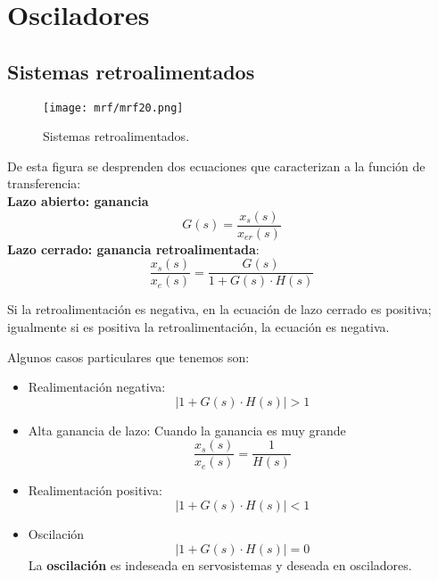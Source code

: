 \documentclass[
	12pt, %
	fleqn, %
	a4paper, %
	oneside, %
]{LegrandOrangeBook}
\begin{document}
\section{Osciladores}
\subsection{Sistemas retroalimentados}
\begin{figure}[H]
\centering
\texttt{[image: mrf/mrf20.png]}
\caption{Sistemas retroalimentados.}
\label{fig:sis retro}
\end{figure}
De esta figura se desprenden dos ecuaciones que caracterizan a la función de transferencia:\\
\textbf{Lazo abierto: ganancia}
\begin{equation}
G(s)=\frac{x_s(s)}{x_{er}(s)}
\end{equation}
\textbf{Lazo cerrado: ganancia retroalimentada}:
\begin{equation}
\frac{x_s(s)}{x_e(s)}=\frac{G(s)}{1+G(s)\cdot H(s)}
\label{eq:fun tran retro}
\end{equation}
\begin{notation}
Si la retroalimentación es negativa, en la ecuación de lazo cerrado es positiva; igualmente si es positiva la retroalimentación, la ecuación es negativa.
\end{notation}
Algunos casos particulares que tenemos son:
\begin{itemize}
\item Realimentación negativa:
\begin{displaymath}
|1+G(s)\cdot H(s)|>1
\end{displaymath}
\item Alta ganancia de lazo: Cuando la ganancia es muy grande
\begin{displaymath}
\frac{x_s(s)}{x_e(s)}=\frac{1}{H(s)}
\end{displaymath}
\item Realimentación positiva:
\begin{displaymath}
|1+G(s)\cdot H(s)|<1
\end{displaymath}
\item Oscilación
\begin{displaymath}
|1+G(s)\cdot H(s)|=0
\end{displaymath}
La \textbf{oscilación} es indeseada en servosistemas y deseada en osciladores.
\end{itemize}
\end{document}
